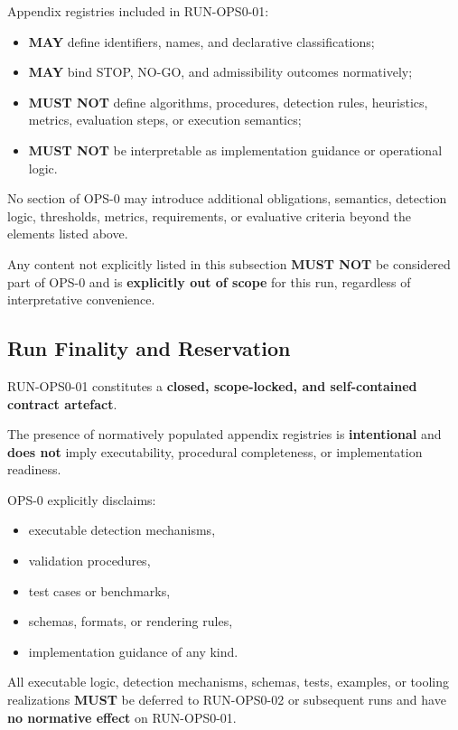 Appendix registries included in RUN-OPS0-01:
\begin{itemize}
  \item \textbf{MAY} define identifiers, names, and declarative classifications;
  \item \textbf{MAY} bind STOP, NO-GO, and admissibility outcomes normatively;
  \item \textbf{MUST NOT} define algorithms, procedures, detection rules,
        heuristics, metrics, evaluation steps, or execution semantics;
  \item \textbf{MUST NOT} be interpretable as implementation guidance
        or operational logic.
\end{itemize}

No section of OPS-0 may introduce additional obligations, semantics,
detection logic, thresholds, metrics, requirements,
or evaluative criteria beyond the elements listed above.

Any content not explicitly listed in this subsection
\textbf{MUST NOT} be considered part of OPS-0
and is \textbf{explicitly out of scope} for this run,
regardless of interpretative convenience.

\subsection{Run Finality and Reservation}
RUN-OPS0-01 constitutes a \textbf{closed, scope-locked,
and self-contained contract artefact}.

The presence of normatively populated appendix registries
is \textbf{intentional} and \textbf{does not} imply executability,
procedural completeness, or implementation readiness.

OPS-0 explicitly disclaims:
\begin{itemize}
  \item executable detection mechanisms,
  \item validation procedures,
  \item test cases or benchmarks,
  \item schemas, formats, or rendering rules,
  \item implementation guidance of any kind.
\end{itemize}

All executable logic, detection mechanisms,
schemas, tests, examples, or tooling realizations
\textbf{MUST} be deferred to RUN-OPS0-02
or subsequent runs and have \textbf{no normative effect}
on RUN-OPS0-01.
